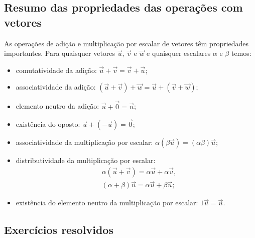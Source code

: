 \subsection{Resumo das propriedades das operações com vetores}

As operações de adição e multiplicação por escalar de vetores têm propriedades importantes. Para quaisquer vetores $\vec{u}$, $\vec{v}$ e $\vec{w}$ e quaisquer escalares $\alpha$ e $\beta$ temos:
\begin{itemize}
\item comutatividade da adição: $\vec{u}+\vec{v}=\vec{v}+\vec{u}$;
\item associatividade da adição: $(\vec{u} + \vec{v}) + \vec{w} = \vec{u} + (\vec{v} + \vec{w})$;
\item elemento neutro da adição: $\vec{u}+\vec{0}=\vec{u}$;
\item existência do oposto: $\vec{u}+(-\vec{u}) = \vec{0}$;
\item associatividade da multiplicação por escalar: $\alpha(\beta\vec{u})=(\alpha\beta)\vec{u}$;
\item distributividade da multiplicação por escalar:
  \begin{align}
    &\alpha(\vec{u}+\vec{v}) = \alpha\vec{u}+\alpha\vec{v},\\
    &(\alpha+\beta)\vec{u} = \alpha\vec{u}+\beta\vec{u};
  \end{align}
\item existência do elemento neutro da multiplicação por escalar: $1\vec{u}=\vec{u}$.
\end{itemize}

\subsection*{Exercícios resolvidos}

